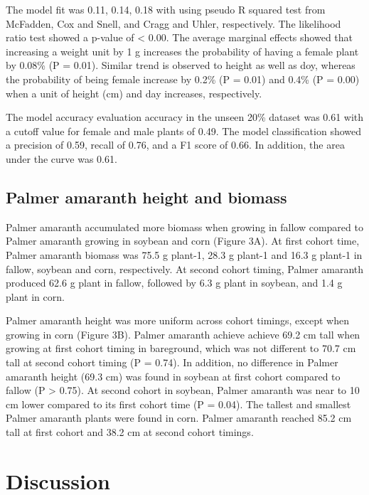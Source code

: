 \documentclass[utf8]{frontiersSCNS}
\begin{document}
The model fit was 0.11, 0.14, 0.18 with using pseudo R squared test from
McFadden, Cox and Snell, and Cragg and Uhler, respectively. The
likelihood ratio test showed a p-value of \textless{} 0.00. The average
marginal effects showed that increasing a weight unit by 1 g increases
the probability of having a female plant by 0.08\% (P = 0.01). Similar
trend is observed to height as well as doy, whereas the probability of
being female increase by 0.2\% (P = 0.01) and 0.4\% (P = 0.00) when a
unit of height (cm) and day increases, respectively.

The model accuracy evaluation accuracy in the unseen 20\% dataset was
0.61 with a cutoff value for female and male plants of 0.49. The model
classification showed a precision of 0.59, recall of 0.76, and a F1
score of 0.66. In addition, the area under the curve was 0.61.

\hypertarget{palmer-amaranth-height-and-biomass}{%
\subsection*{Palmer amaranth height and
biomass}\label{palmer-amaranth-height-and-biomass}}

Palmer amaranth accumulated more biomass when growing in fallow compared
to Palmer amaranth growing in soybean and corn (Figure 3A). At first
cohort time, Palmer amaranth biomass was 75.5 g plant-1, 28.3 g plant-1
and 16.3 g plant-1 in fallow, soybean and corn, respectively. At second
cohort timing, Palmer amaranth produced 62.6 g plant in fallow, followed
by 6.3 g plant in soybean, and 1.4 g plant in corn.

Palmer amaranth height was more uniform across cohort timings, except
when growing in corn (Figure 3B). Palmer amaranth achieve achieve 69.2
cm tall when growing at first cohort timing in bareground, which was not
different to 70.7 cm tall at second cohort timing (P = 0.74). In
addition, no difference in Palmer amaranth height (69.3 cm) was found in
soybean at first cohort compared to fallow (P \textgreater{} 0.75). At
second cohort in soybean, Palmer amaranth was near to 10 cm lower
compared to its first cohort time (P = 0.04). The tallest and smallest
Palmer amaranth plants were found in corn. Palmer amaranth reached 85.2
cm tall at first cohort and 38.2 cm at second cohort timings.

\hypertarget{discussion}{%
\section*{Discussion}\label{discussion}}
\end{document}
